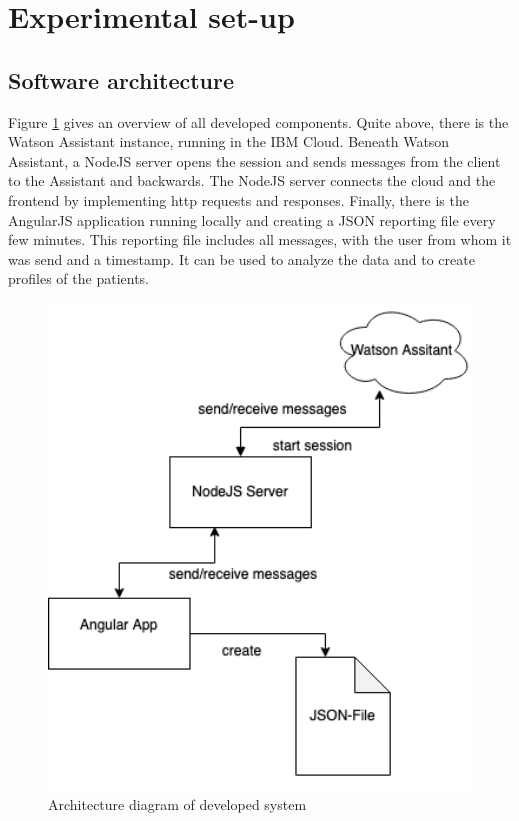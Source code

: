 \section{Experimental set-up}

\subsection{Software architecture}

Figure \ref{architecture_0102} gives an overview of all developed components. Quite above, there is the Watson Assistant instance, running in the IBM Cloud. Beneath Watson Assistant, a NodeJS server opens the session and sends messages from the client to the Assistant and backwards. The NodeJS server connects the cloud and the frontend by implementing \ac{http} requests and responses. Finally, there is the AngularJS application running locally and creating a \ac{JSON} reporting file every few minutes. This reporting file includes all messages, with the user from whom it was send and a timestamp. It can be used to analyze the data and to create profiles of the patients.

\begin{figure}[ht]
	\centering
	\includegraphics[width=1\textwidth]{images/architecture_0102.png}
	\caption{Architecture diagram of developed system}
	\label{architecture_0102}
\end{figure}


